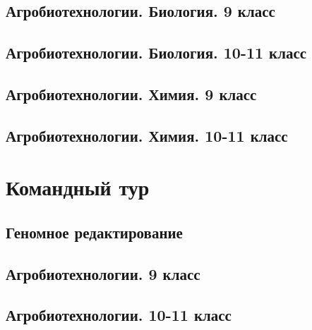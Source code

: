 \documentclass[a4paper,12pt,oneside]{book}
\begin{document}
\section{Агробиотехнологии. Биология. 9 класс}


\section{Агробиотехнологии. Биология. 10-11 класс}


\section{Агробиотехнологии. Химия. 9 класс}


\section{Агробиотехнологии. Химия. 10-11 класс}



\chapter{Командный тур}
\section{Геномное редактирование}


\section{Агробиотехнологии. 9 класс} 



\section{Агробиотехнологии. 10-11 класс}


\end{document}
